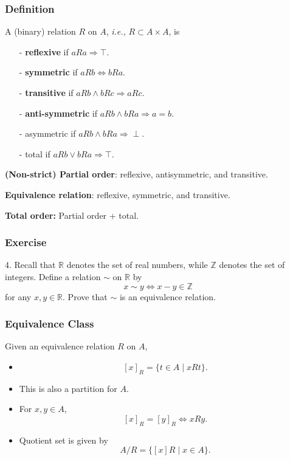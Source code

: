 \documentclass{beamer}
\begin{document}
\begin{frame}
    \frametitle{Definition}
    \parbox{\textwidth}{
		\par A (binary) relation $R$ on $A$, \textit{i.e.,} $R \subset A \times A$, is
		\begin{itemize}
			\item[-] \textbf{ref\mbox{l}exive} if $aRa \Rightarrow \top$.
			\item[-] \textbf{symmetric} if $aRb \Leftrightarrow bRa$.
			\item[-] \textbf{transitive} if $aRb \wedge bRc \Rightarrow aRc$.
			\item[-] \textbf{anti-symmetric} if $aRb \wedge bRa \Rightarrow a = b$.
			\item[-] asymmetric if $aRb \wedge bRa \Rightarrow \perp$.
			\item[-] total if $aRb \vee bRa \Rightarrow \top$.
		\end{itemize}
		\par \phantom{ji}
		\par \textbf{(Non-strict) Partial order}: reflexive, antisymmetric, and transitive.
		\par \textbf{Equivalence relation}: reflexive, symmetric, and transitive.
        \par \textbf{Total order:} Partial order + total.
    }
\end{frame}
\begin{frame}
    \frametitle{Exercise}
    4. Recall that $\mathbb{R}$ denotes the set of real numbers, while $\mathbb{Z}$ denotes the set of integers. Define a relation $\sim$ on $\mathbb{R}$ by
    \begin{equation*}
        x \sim y \Leftrightarrow x - y \in \mathbb{Z}
    \end{equation*}
    for any $x, y \in \mathbb{R}$. Prove that $\sim$ is an equivalence relation.
\end{frame}
\begin{frame}
    \frametitle{Equivalence Class}
    Given an equivalence relation $R$ on $A$,
    \begin{itemize}
        \item {} $$\left[ x\right]_R = \{t \in A \mid xRt\}.$$
        \item This is also a partition for $A$.
        \item For $x , y \in A$, $$\left[ x \right]_R  = \left[ y \right]_R \Leftrightarrow xRy.$$
        \item Quotient set is given by $$A/R = \{[x]R \mid x \in A\}.$$
    \end{itemize}
\end{frame}
\end{document}
